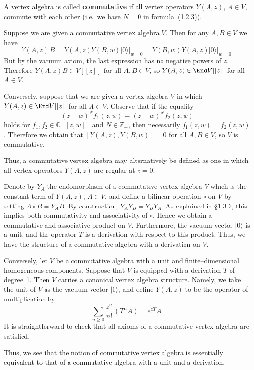 \documentclass[12pt]{article}
\begin{document}
\begin{example}
    A vertex algebra is called \textbf{commutative} if all vertex operators
    $Y(A,z)$, $A \in V$, commute with each other (i.e.\ we have $N=0$ in formula~(1.2.3)).

    Suppose we are given a commutative vertex algebra $V$.
    Then for any $A,B \in V$ we have
    \[
        Y(A,z)\,B = Y(A,z)Y(B,w)\lvert 0 \rangle\big|_{w=0}
        = Y(B,w)Y(A,z)\lvert 0 \rangle\big|_{w=0}.
    \]
    But by the vacuum axiom, the last expression has no negative powers of $z$.
    Therefore $Y(A,z)B \in V[[z]]$ for all $A,B \in V$,
    so $Y(A,z) \in \End V[[z]]$ for all $A \in V$.

    Conversely, suppose that we are given a vertex algebra $V$ in which
    $Y(A,z) \in \End V[[z]]$ for all $A \in V$.
    Observe that if the equality
    \[
        (z-w)^N f_1(z,w) = (z-w)^N f_2(z,w)
    \]
    holds for $f_1,f_2 \in \mathbb{C}[[z,w]]$ and $N \in \mathbb{Z}_+$,
    then necessarily $f_1(z,w) = f_2(z,w)$.
    Therefore we obtain that $[Y(A,z),Y(B,w)] = 0$ for all $A,B \in V$,
    so $V$ is commutative.

    Thus, a commutative vertex algebra may alternatively be defined as one
    in which all vertex operators $Y(A,z)$ are regular at $z=0$.

    \medskip

    Denote by $Y_A$ the endomorphism of a commutative vertex algebra $V$
    which is the constant term of $Y(A,z)$, $A \in V$, and define a bilinear
    operation $\circ$ on $V$ by setting $A \circ B = Y_A B$.
    By construction, $Y_A Y_B = Y_B Y_A$.
    As explained in \S1.3.3, this implies both commutativity and associativity
    of $\circ$.
    Hence we obtain a commutative and associative product on $V$.
    Furthermore, the vacuum vector $\lvert 0 \rangle$ is a unit,
    and the operator $T$ is a derivation with respect to this product.
    Thus, we have the structure of a commutative algebra with a derivation on $V$.

    \medskip

    Conversely, let $V$ be a commutative algebra with a unit and
    finite–dimensional homogeneous components.
    Suppose that $V$ is equipped with a derivation $T$ of degree~1.
    Then $V$ carries a canonical vertex algebra structure.
    Namely, we take the unit of $V$ as the vacuum vector $\lvert 0 \rangle$,
    and define $Y(A,z)$ to be the operator of multiplication by
    \[
        \sum_{n \ge 0} \frac{z^n}{n!}\,(T^n A) = e^{zT}A.
    \]
    It is straightforward to check that all axioms of a commutative vertex algebra
    are satisfied.

    \medskip

    Thus, we see that the notion of commutative vertex algebra is essentially
    equivalent to that of a commutative algebra with a unit and a derivation.
\end{example}
\end{document}
